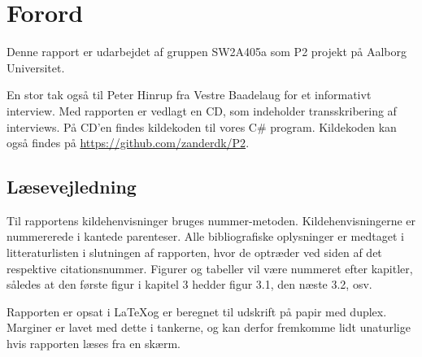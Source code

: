 \chapter*{Forord}
Denne rapport er udarbejdet af gruppen SW2A405a som P2 projekt på Aalborg Universitet.


En stor tak også til Peter Hinrup fra Vestre Baadelaug for et informativt interview.
Med rapporten er vedlagt en CD, som indeholder transskribering af interviews. På CD'en findes kildekoden til vores C\# program. Kildekoden kan også findes på \url{https://github.com/zanderdk/P2}.


\section{Læsevejledning}
Til rapportens kildehenvisninger bruges nummer-metoden. Kildehenvisningerne er nummererede i kantede parenteser. Alle bibliografiske oplysninger er medtaget i litteraturlisten i slutningen af rapporten, hvor de optræder ved siden af det respektive citationsnummer. Figurer og tabeller vil være nummeret efter kapitler, således at den første figur i kapitel 3 hedder figur 3.1, den næste 3.2, osv.	

Rapporten er opsat i \LaTeX og er beregnet til udskrift på papir med duplex. Marginer er lavet med dette i tankerne, og kan derfor fremkomme lidt unaturlige hvis rapporten læses fra en skærm.
